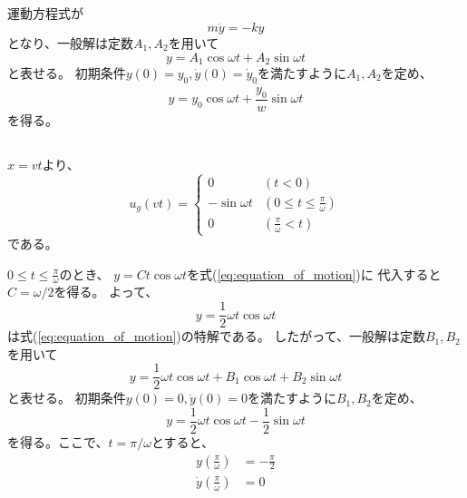 \documentclass[a4paper]{jsarticle}
\begin{document}
\subsection{}
運動方程式が
\begin{equation}
  m \ddot{y} = - k y
\end{equation}
となり、一般解は定数$A_1, A_2$を用いて
\begin{equation}
  y = A_1 \cos \omega t + A_2 \sin \omega t
\end{equation}
と表せる。
初期条件$y(0) = y_0, \dot{y}(0) = \dot{y}_0$を満たすように$A_1,A_2$を定め、
\begin{equation}
  y = y_0 \cos \omega t + \frac{\dot{y}_0}{w} \sin \omega t
\end{equation}
を得る。

\subsection{}
$x = vt$より、
\begin{equation}
  u_g(vt) =
  \begin{cases}
    0              & (t < 0)                            \\
    -\sin \omega t & (0 \leq t \leq \frac{\pi}{\omega}) \\
    0              & (\frac{\pi}{\omega} < t)
  \end{cases}
\end{equation}
である。\par
$0 \leq t \leq \frac{\pi}{\omega}$のとき、
$y = C t \cos \omega t$を式(\ref{eq:equation_of_motion})に
代入すると$C = \omega / 2$を得る。
よって、
\begin{equation}
  y = \frac{1}{2} \omega t \cos \omega t
\end{equation}
は式(\ref{eq:equation_of_motion})の特解である。
したがって、一般解は定数$B_1, B_2$を用いて
\begin{equation}
  y = \frac{1}{2} \omega t \cos \omega t + B_1 \cos \omega t + B_2 \sin \omega t
\end{equation}
と表せる。
初期条件$y(0) = 0, \dot{y}(0) = 0$を満たすように$B_1,B_2$を定め、
\begin{equation}
  \label{eq:solution_1}
  y = \frac{1}{2} \omega t \cos \omega t - \frac{1}{2} \sin \omega t
\end{equation}
を得る。ここで、$t = \pi / \omega$とすると、
\begin{align}
  \label{eq:init_pi/omega_y}
  y\left(\frac{\pi}{\omega}\right)       & = -\frac{\pi}{2} \\
  \label{eq:init_pi/omega_ydot}
  \dot{y}\left(\frac{\pi}{\omega}\right) & = 0
\end{align}
\end{document}
